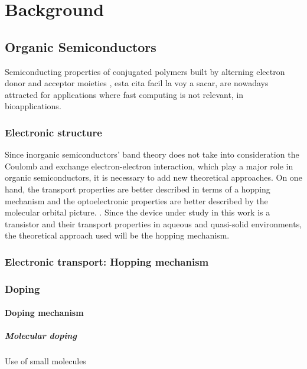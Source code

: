 {\chapter{Background}}
\label{sec:background}

\section{Organic Semiconductors}

Semiconducting properties of conjugated polymers built by alterning electron donor and acceptor moieties \cite{matt_electronic_2021}, esta cita facil la voy a sacar, are nowadays attracted for applications where fast computing is not relevant, in bioapplications. 


\subsection{Electronic structure}

Since inorganic semiconductors' band theory does not take into consideration the Coulomb and exchange electron-electron interaction, which play a major role in organic semiconductors, it is necessary to add new theoretical approaches. On one hand, the transport properties are better described in terms of a hopping mechanism and the optoelectronic properties are better described by the molecular orbital picture. \cite{alcacer_electronic_2018}. Since the device under study in this work is a transistor and their transport properties in aqueous and quasi-solid environments, the theoretical approach used will be the hopping mechanism.

\subsection{Electronic transport: Hopping mechanism}

\subsection{Doping}
\subsubsection{Doping mechanism}
\paragraph{Molecular doping}
Use of small molecules

